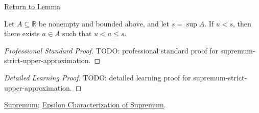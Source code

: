 \newpage
{}
\label{prf:supremum-strict-upper-approximation}

\begin{remark*}[Return]
\hyperref[lem:supremum-strict-upper-approximation]{Return to Lemma}
\end{remark*}

\begin{lemma*}
Let $A\subseteq\mathbb{R}$ be nonempty and bounded above, and let
$s=\sup A$. If $u<s$, then there exists $a\in A$ such that $u<a\le s$.
\end{lemma*}

\begin{proof}[Professional Standard Proof]
\LRAProofBodyStart
TODO: professional standard proof for supremum-strict-upper-approximation.
\end{proof}

\begin{proof}[Detailed Learning Proof]
\LRAProofBodyStart
TODO: detailed learning proof for supremum-strict-upper-approximation.
\end{proof}

\begin{remark*}
\end{remark*}

\begin{dependencies}
\hyperref[def:supremum]{Supremum};
\hyperref[def:epsilon-characterization-of-supremum]{Epsilon Characterization of Supremum}.
\end{dependencies}

\clearpage

